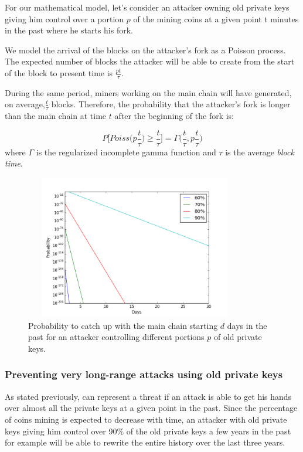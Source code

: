 \documentclass[a4paper,11pt]{article}
\begin{document}
For our mathematical model, let’s consider an attacker owning old private keys giving him control over a portion $p$ of the mining coins at a given point t minutes in the past where he starts his fork.

We model the arrival of the blocks on the attacker's fork as a Poisson process. The expected number of blocks the attacker will be able to create from the start of the block to present time is $\frac{p t}{\tau}$.

During the same period, miners working on the main chain will have generated, on average,$\frac{t}{\tau}$ blocks. Therefore, the probability that the attacker's fork is longer than the main chain at time $t$ after the beginning of the fork is:

$$P\Big[ Poiss\big(p\frac{t}{\tau}\big)\geq  \frac{t}{\tau} \Big]=\Gamma\Big(\frac{t}{\tau},p\frac{t}{\tau} \Big)$$
where $\Gamma$ is the regularized incomplete gamma function and $\tau$ is the average \textit{block time}.


\begin{figure}[H]
\centering
\includegraphics[width=96mm,height=63mm]{05_oldprivates.png}
\caption{Probability to catch up with the main chain starting $d$ days in the past for an attacker controlling different portions $p$ of old private keys.}
\end{figure}

\subsubsection*{Preventing very long-range attacks using old private keys}

As stated previously, can represent a threat if an attack is able to get his hands over almost all the private keys at a given point in the past.
Since the percentage of coins mining is expected to decrease with time, an attacker with old private keys giving him control over 90\% of the old private keys a few years in the past for example will be able to rewrite the entire history over the last three years.
\end{document}
